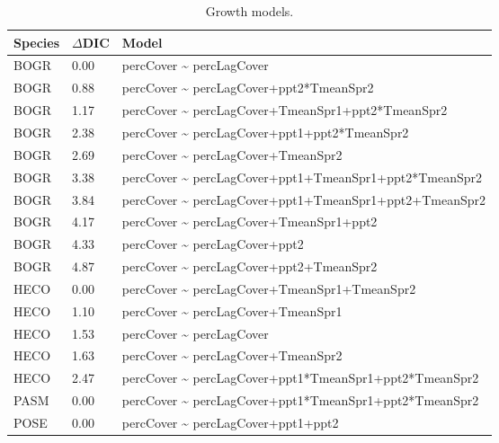\documentclass[10pt]{article}
\begin{document}
\begin{table}[ht]
\centering
\caption{Growth models.} 
\begin{tabularx}{\textwidth}{llZ}
  \hline
Species & $\Delta$DIC & Model \\ 
  \hline
BOGR & 0.00 & percCover \~{} percLagCover \\ 
  BOGR & 0.88 & percCover \~{} percLagCover+ppt2*TmeanSpr2 \\ 
  BOGR & 1.17 & percCover \~{} percLagCover+TmeanSpr1+ppt2*TmeanSpr2 \\ 
  BOGR & 2.38 & percCover \~{} percLagCover+ppt1+ppt2*TmeanSpr2 \\ 
  BOGR & 2.69 & percCover \~{} percLagCover+TmeanSpr2 \\ 
  BOGR & 3.38 & percCover \~{} percLagCover+ppt1+TmeanSpr1+ppt2*TmeanSpr2 \\ 
  BOGR & 3.84 & percCover \~{} percLagCover+ppt1+TmeanSpr1+ppt2+TmeanSpr2 \\ 
  BOGR & 4.17 & percCover \~{} percLagCover+TmeanSpr1+ppt2 \\ 
  BOGR & 4.33 & percCover \~{} percLagCover+ppt2 \\ 
  BOGR & 4.87 & percCover \~{} percLagCover+ppt2+TmeanSpr2 \\ 
  HECO & 0.00 & percCover \~{} percLagCover+TmeanSpr1+TmeanSpr2 \\ 
  HECO & 1.10 & percCover \~{} percLagCover+TmeanSpr1 \\ 
  HECO & 1.53 & percCover \~{} percLagCover \\ 
  HECO & 1.63 & percCover \~{} percLagCover+TmeanSpr2 \\ 
  HECO & 2.47 & percCover \~{} percLagCover+ppt1*TmeanSpr1+ppt2*TmeanSpr2 \\ 
  PASM & 0.00 & percCover \~{} percLagCover+ppt1*TmeanSpr1+ppt2*TmeanSpr2 \\ 
  POSE & 0.00 & percCover \~{} percLagCover+ppt1+ppt2 \\ 
   \hline
\end{tabularx}
\end{table}
\end{document}
